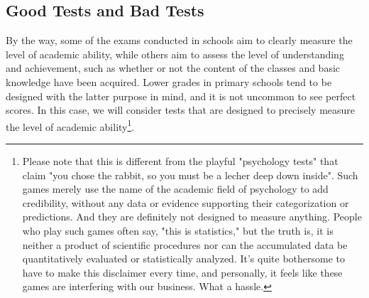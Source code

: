 \documentclass{ltjbook}
\begin{document}
\subsection{Good Tests and Bad Tests}
By the way, some of the exams conducted in schools aim to clearly measure the level of academic ability, while others aim to assess the level of understanding and achievement, such as whether or not the content of the classes and basic knowledge have been acquired. Lower grades in primary schools tend to be designed with the latter purpose in mind, and it is not uncommon to see perfect scores. In this case, we will consider tests that are designed to precisely measure the level of academic ability\footnote{Please note that this is different from the playful "psychology tests" that claim "you chose the rabbit, so you must be a lecher deep down inside". Such games merely use the name of the academic field of psychology to add credibility, without any data or evidence supporting their categorization or predictions. And they are definitely not designed to measure anything. People who play such games often say, "this is statistics," but the truth is, it is neither a product of scientific procedures nor can the accumulated data be quantitatively evaluated or statistically analyzed. It's quite bothersome to have to make this disclaimer every time, and personally, it feels like these games are interfering with our business. What a hassle.}.
\end{document}
